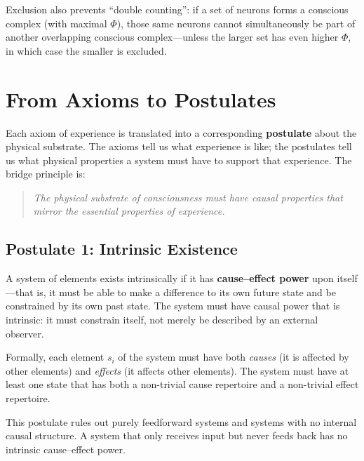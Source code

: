 \documentclass[11pt,a4paper]{report}
\newcommand{\Phi}{\varPhi}
\begin{document}
Exclusion also prevents ``double counting'': if a set of neurons forms a conscious complex (with maximal $\Phi$), those same neurons cannot simultaneously be part of another overlapping conscious complex---unless the larger set has even higher $\Phi$, in which case the smaller is excluded.


\chapter{From Axioms to Postulates}

Each axiom of experience is translated into a corresponding \textbf{postulate} about the physical substrate. The axioms tell us what experience is like; the postulates tell us what physical properties a system must have to support that experience. The bridge principle is:

\begin{quote}
\emph{The physical substrate of consciousness must have causal properties that mirror the essential properties of experience.}
\end{quote}

\section{Postulate 1: Intrinsic Existence}

\begin{postulatebox}
A system of elements exists intrinsically if it has \textbf{cause--effect power} upon itself---that is, it must be able to make a difference to its own future state and be constrained by its own past state. The system must have causal power that is intrinsic: it must constrain itself, not merely be described by an external observer.
\end{postulatebox}

Formally, each element $s_i$ of the system must have both \emph{causes} (it is affected by other elements) and \emph{effects} (it affects other elements). The system must have at least one state that has both a non-trivial cause repertoire and a non-trivial effect repertoire.

This postulate rules out purely feedforward systems and systems with no internal causal structure. A system that only receives input but never feeds back has no intrinsic cause--effect power.
\end{document}
